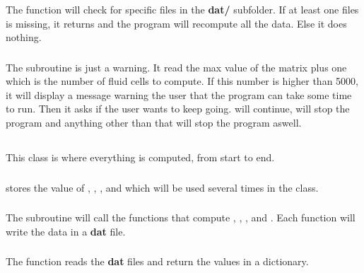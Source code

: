 \subsubsection{\textcolor{func}{}}
The function \textcolor{func}{} will check for specific
files in the \textbf{dat/} subfolder. If at least one files is missing, it
returns  and the program will recompute all the data. Else it does
nothing.

\subsubsection{\textcolor{func}{}}
The subroutine \textcolor{func}{} is just a warning. It read the max value of
the matrix  plus one which is the number of fluid cells to compute.
If this number is higher than 5000, it will display a message warning the user
that the program can take some time to run. Then it asks if the user wants to
keep going.  will continue,  will stop the program and
anything other than that will stop the program aswell.

\subsection{}
This class is where everything is computed, from start to end.

\subsubsection{\textcolor{func}{}}
\textcolor{func}{} stores the value of , , ,  and
 which will be used several times in the class.

\subsubsection{\textcolor{func}{}}
The subroutine \textcolor{func}{} will call the functions that compute ,
, ,  and . Each function
will write the data in a \textbf{dat} file.

\subsubsection{\textcolor{func}{}}
The function \textcolor{func}{} reads the \textbf{dat} files and return the
values in a dictionary.

